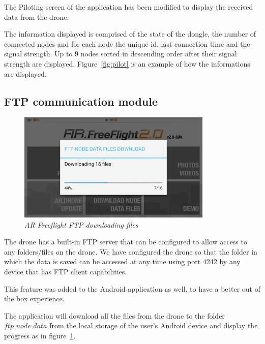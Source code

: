 The Piloting screen of the application has been modified to display the received data from the drone.

The information displayed is comprised of the state of the dongle, the number of connected nodes and for each node the unique id, last connection time and the signal strength. Up to 9 nodes sorted in descending order after their signal strength are displayed. Figure~\ref{fig:pilot} is an example of how the informations are displayed.

\subsection{FTP communication module}

\begin{figure}[ht]
\begin{center}
\includegraphics[width=0.825\textwidth]{img/android_ftp.png}
\end{center}
\caption{\small \itshape{AR Freeflight FTP downloading files}}
  \label{fig:ftp}
\end{figure}

The drone has a built-in FTP server that can be configured to allow access to any folders/files on the drone. We have configured the drone so that the folder in which the data is saved can be accessed at any time using port 4242 by any device that has FTP client capabilities. 

This feature was added to the Android application as well, to have a better out of the box experience.

The application will download all the files from the drone to the folder $ftp\_node\_data$ from the local storage of the user's Android device and display the progress as in figure~\ref{fig:ftp}.

